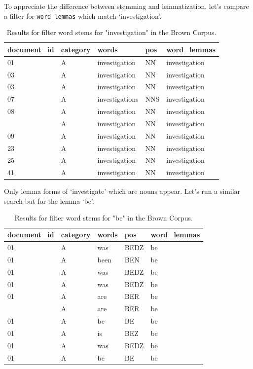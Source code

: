 \documentclass[
]{article}
\begin{document}
To appreciate the difference between stemming and lemmatization, let's compare a filter for \texttt{word\_lemmas} which match `investigation'.

\begin{table}

\caption{\label{tab:recoding-lemmatization-brown-investigation}Results for filter word stems for "investigation" in the Brown Corpus.}
\centering
\begin{tabular}[t]{lllll}
\toprule
document\_id & category & words & pos & word\_lemmas\\
\midrule
01 & A & investigation & NN & investigation\\
03 & A & investigation & NN & investigation\\
03 & A & investigation & NN & investigation\\
07 & A & investigations & NNS & investigation\\
08 & A & investigation & NN & investigation\\
\addlinespace
09 & A & investigation & NN & investigation\\
09 & A & investigation & NN & investigation\\
23 & A & investigation & NN & investigation\\
25 & A & investigation & NN & investigation\\
41 & A & investigation & NN & investigation\\
\bottomrule
\end{tabular}
\end{table}

Only lemma forms of `investigate' which are nouns appear. Let's run a similar search but for the lemma `be'.

\begin{table}

\caption{\label{tab:recoding-lemmatization-brown-be}Results for filter word stems for "be" in the Brown Corpus.}
\centering
\begin{tabular}[t]{lllll}
\toprule
document\_id & category & words & pos & word\_lemmas\\
\midrule
01 & A & was & BEDZ & be\\
01 & A & been & BEN & be\\
01 & A & was & BEDZ & be\\
01 & A & was & BEDZ & be\\
01 & A & are & BER & be\\
\addlinespace
01 & A & are & BER & be\\
01 & A & be & BE & be\\
01 & A & is & BEZ & be\\
01 & A & was & BEDZ & be\\
01 & A & be & BE & be\\
\bottomrule
\end{tabular}
\end{table}
\end{document}
